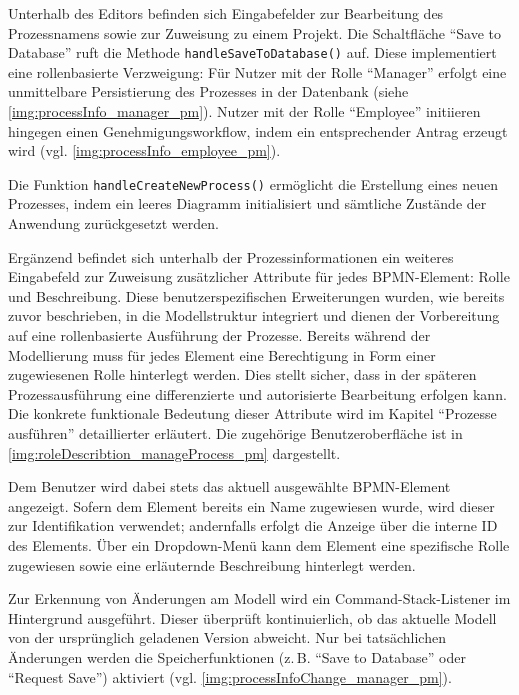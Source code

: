 Unterhalb des Editors befinden sich Eingabefelder zur Bearbeitung des Prozessnamens sowie zur Zuweisung zu einem Projekt. Die Schaltfläche \enquote{Save to Database} ruft die Methode \texttt{handleSaveToDatabase()} auf. Diese implementiert eine rollenbasierte Verzweigung: Für Nutzer mit der Rolle \enquote{Manager} erfolgt eine unmittelbare Persistierung des Prozesses in der Datenbank (siehe \autoref{img:processInfo_manager_pm}). Nutzer mit der Rolle \enquote{Employee} initiieren hingegen einen Genehmigungsworkflow, indem ein entsprechender Antrag erzeugt wird (vgl. \autoref{img:processInfo_employee_pm}).


Die Funktion \texttt{handleCreateNewProcess()} ermöglicht die Erstellung eines neuen Prozesses, indem ein leeres Diagramm initialisiert und sämtliche Zustände der Anwendung zurückgesetzt werden.

Ergänzend befindet sich unterhalb der Prozessinformationen ein weiteres Eingabefeld zur Zuweisung zusätzlicher Attribute für jedes BPMN-Element: Rolle und Beschreibung. Diese benutzerspezifischen Erweiterungen wurden, wie bereits zuvor beschrieben, in die Modellstruktur integriert und dienen der Vorbereitung auf eine rollenbasierte Ausführung der Prozesse. Bereits während der Modellierung muss für jedes Element eine Berechtigung in Form einer zugewiesenen Rolle hinterlegt werden. Dies stellt sicher, dass in der späteren Prozessausführung eine differenzierte und autorisierte Bearbeitung erfolgen kann. Die konkrete funktionale Bedeutung dieser Attribute wird im Kapitel \enquote{Prozesse ausführen} detaillierter erläutert. Die zugehörige Benutzeroberfläche ist in \autoref{img:roleDescribtion_manageProcess_pm} dargestellt.


Dem Benutzer wird dabei stets das aktuell ausgewählte BPMN-Element angezeigt. Sofern dem Element bereits ein Name zugewiesen wurde, wird dieser zur Identifikation verwendet; andernfalls erfolgt die Anzeige über die interne ID des Elements. Über ein Dropdown-Menü kann dem Element eine spezifische Rolle zugewiesen sowie eine erläuternde Beschreibung hinterlegt werden.

Zur Erkennung von Änderungen am Modell wird ein Command-Stack-Listener im Hintergrund ausgeführt. Dieser überprüft kontinuierlich, ob das aktuelle Modell von der ursprünglich geladenen Version abweicht. Nur bei tatsächlichen Änderungen werden die Speicherfunktionen (z.\,B. \enquote{Save to Database} oder \enquote{Request Save}) aktiviert (vgl. \autoref{img:processInfoChange_manager_pm}).

